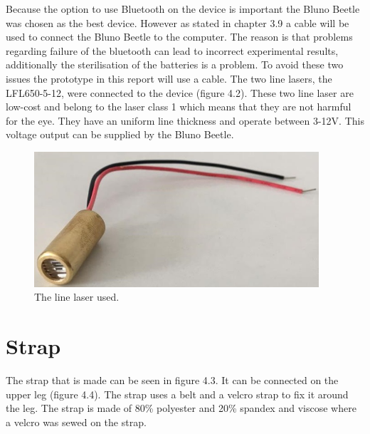 \documentclass[whitelogo]{tudelft-report}
\begin{document}
{{{{Because the option to use Bluetooth on the device is important the Bluno Beetle was chosen as the best device. However as stated in chapter 3.9 a cable will be used to connect the Bluno Beetle to the computer. The reason is that problems regarding failure of the bluetooth can lead to incorrect experimental results, additionally the sterilisation of the batteries is a problem. To avoid these two issues the prototype in this report will use a cable. The two line lasers, the LFL650-5-12, were connected to the device (figure 4.2). These two line laser are low-cost and belong to the laser class 1 which means that they are not harmful for the eye. They have an uniform line thickness and operate between 3-12V. This voltage output can be supplied by the Bluno Beetle.
\begin{figure}[htb]
	\centering\includegraphics[width=300pt]{casing/line_laser.jpg}
	\caption{The line laser used.}
\end{figure}
\section{Strap}
The strap that is made can be seen in figure 4.3. It can be connected on the upper leg (figure 4.4). The strap uses a belt and a velcro strap to fix it around the leg. The strap is made of 80\% polyester and 20\% spandex and viscose where a velcro was sewed on the strap.

}}}}
\end{document}
